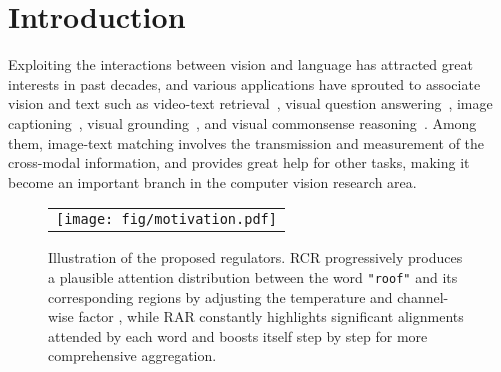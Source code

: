 \documentclass[journal]{IEEEtran}\newcommand{\ignore}[1]{}
\begin{document}
\section{Introduction}
Exploiting the interactions between vision and language has attracted great interests in past decades, and various applications have sprouted to associate vision and text such as video-text retrieval~\cite{HGR,EHLS,HIT}, visual question answering~\cite{DAN}, image captioning~\cite{BU_TDA}, visual grounding~\cite{LGGAN}, and visual commonsense reasoning~\cite{VCR}. Among them, image-text matching involves the transmission and measurement of the cross-modal information, and provides great help for other tasks, making it become an important branch in the computer vision research area.

\begin{figure}[htpb]
	\centering
	\begin{tabular}{@{}c}
    	\texttt{[image: fig/motivation.pdf]} 
	\end{tabular}
	\caption{Illustration of the proposed regulators. RCR progressively produces a plausible attention distribution between the word \texttt{"roof"} and its corresponding regions by adjusting the temperature  and channel-wise factor , while RAR constantly highlights significant alignments attended by each word and boosts itself step by step for more comprehensive aggregation.}
	\label{fig:motivation}
\end{figure}
\end{document}

